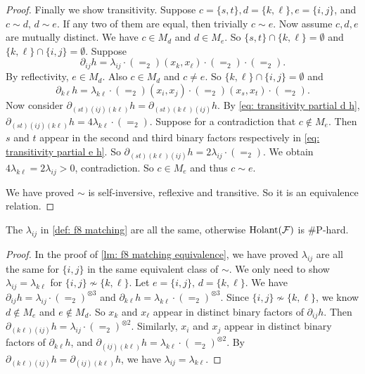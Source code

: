 \begin{proof}
    Finally we show transitivity.
    Suppose $c=\{s,t\},d=\{k,\ell\},e=\{i,j\}$, and $c\sim d,\,d\sim e$.
    If any two of them are equal, then trivially $c\sim e.$
    Now assume $c,d,e$ are mutually distinct.
    We have $c\in M_d$ and $d\in M_e$.
    So $\{s,t\}\cap\{k,\ell\}=\emptyset$ and $\{k,\ell\} \cap \{i,j\}=\emptyset.$
    Suppose 
    \begin{equation}\label{eq: transitivity partial e h}
        \partial_{ij}h=\lambda_{ij}\cdot (=_2)(x_k,x_{\ell})\cdot (=_2)\cdot (=_2).
    \end{equation}
    By reflectivity, $e\in M_d$.
    Also $c\in M_d$ and $c\neq e$.
    So $\{k,\ell\}\cap\{i,j\}=\emptyset$ and
    \begin{equation}\label{eq: transitivity partial d h}
        \partial_{k\ell}h=\lambda_{k\ell}\cdot (=_2)(x_i,x_{j})\cdot (=_2)(x_s,x_t)\cdot (=_2).
    \end{equation}
    Now consider $\partial_{(st)(ij)(k\ell)}h=\partial_{(st)(k\ell)(ij)}h$.
    By \eqref{eq: transitivity partial d h}, $\partial_{(st)(ij)(k\ell)}h=4\lambda_{k\ell}\cdot(=_2)$.
    Suppose for a contradiction that $c\notin M_e$.
    Then $s$ and $t$ appear in the second and third binary factors respectively in \eqref{eq: transitivity partial e h}.
    So $\partial_{(st)(k\ell)(ij)}h=2\lambda_{ij}\cdot(=_2)$.
    We obtain $4\lambda_{k\ell}=2\lambda_{ij}>0$, contradiction.
    So $c\in M_e$ and thus $c\sim e$.
    
    We have proved $\sim$ is self-inversive, reflexive and transitive. 
    So it is an equivalence relation. 
\end{proof}

\begin{lemma}\label{lm: f8 same coe}
    The $\lambda_{ij}$ in \cref{def: f8 matching} are all the same, otherwise $\operatorname{Holant}(\mathcal{F})$ is \#P-hard.
\end{lemma}
\begin{proof}
    In the proof of \cref{lm: f8 matching equivalence}, we have proved $\lambda_{ij}$ are all the same for $\{i,j\}$ in the same equivalent class of $\sim.$
    We only need to show $\lambda_{ij}=\lambda_{k\ell}$ for $\{i,j\}\not \sim \{k,\ell\}.$
    Let $e=\{i,j\},\,d=\{k,\ell\}.$
    We have $\partial_{ij}h=\lambda_{ij}\cdot (=_2)^{\otimes 3}$
    and $\partial_{k\ell}h=\lambda_{k\ell}\cdot (=_2)^{\otimes 3}$.
    Since $\{i,j\}\not \sim\{k,\ell\}$, we know $d\notin M_e$ and $e\notin M_d.$
    So $x_k$ and $x_\ell$ appear in distinct binary factors of $\partial_{ij}h$.
    Then $\partial_{(k\ell)(ij)}h=\lambda_{ij}\cdot (=_2)^{\otimes 2}.$
    Similarly, $x_i$ and $x_j$ appear in distinct binary factors of $\partial_{k\ell}h$, and $\partial_{(ij)(k\ell)}h=\lambda_{k\ell}\cdot (=_2)^{\otimes 2}.$
    By $\partial_{(k\ell)(ij)}h=\partial_{(ij)(k\ell)}h$, we have $\lambda_{ij}=\lambda_{k\ell}$.
\end{proof}

